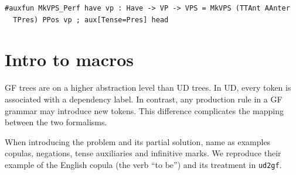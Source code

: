 




\begin{verbatim}
#auxfun MkVPS_Perf have vp : Have -> VP -> VPS = MkVPS (TTAnt AAnter 
  TPres) PPos vp ; aux[Tense=Pres] head
\end{verbatim}

\section{Intro to macros}


GF trees are on a higher abstraction level than UD trees. In UD, every token is associated with a dependency label. In contrast, any production rule in a GF grammar may introduce new tokens. This difference complicates the mapping between the two formalisms.

When introducing the problem and its partial solution, \cite{kolachina-ranta-2017} name as examples copulas, negations, tense auxiliaries and infinitive marks. We reproduce their example of the English copula (the verb “to be”) and its treatment in \verb|ud2gf|.

